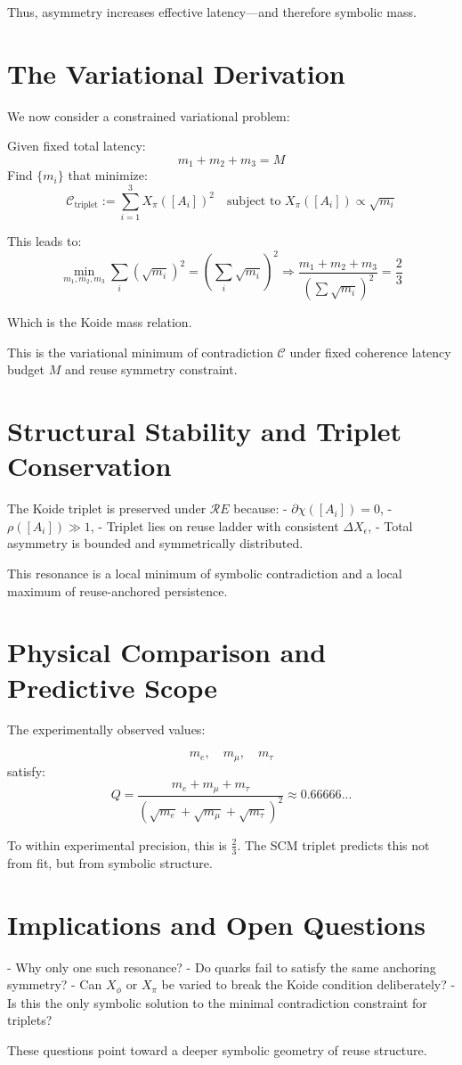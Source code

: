 Thus, asymmetry increases effective latency—and therefore symbolic mass.

\section{The Variational Derivation} \label{sec:koide-derivation}

We now consider a constrained variational problem:

Given fixed total latency:
\[
m_1 + m_2 + m_3 = M
\]
Find $\{m_i\}$ that minimize:
\[
\mathcal{C}_{\text{triplet}} := \sum_{i=1}^3 X_\pi([A_i])^2
\quad \text{subject to } X_\pi([A_i]) \propto \sqrt{m_i}
\]

This leads to:
\[
\min_{m_1, m_2, m_3} \sum_i \left( \sqrt{m_i} \right)^2 = \left( \sum_i \sqrt{m_i} \right)^2
\Rightarrow
\frac{m_1 + m_2 + m_3}{\left( \sum \sqrt{m_i} \right)^2}
= \frac{2}{3}
\]

Which is the Koide mass relation.

This is the variational minimum of contradiction $\mathcal{C}$ under fixed coherence latency budget $M$ and reuse symmetry constraint.

\section{Structural Stability and Triplet Conservation} \label{sec:koide-stability}

The Koide triplet is preserved under $\mathcal{R}E$ because:
- $\partial\chi([A_i]) = 0$,
- $\rho([A_i]) \gg 1$,
- Triplet lies on reuse ladder with consistent $\Delta X_\epsilon$,
- Total asymmetry is bounded and symmetrically distributed.

This resonance is a local minimum of symbolic contradiction and a local maximum of reuse-anchored persistence.

\section{Physical Comparison and Predictive Scope} \label{sec:koide-physical}

The experimentally observed values:

\[
m_e,\quad m_\mu,\quad m_\tau
\]
satisfy:
\[
Q = \frac{m_e + m_\mu + m_\tau}{\left( \sqrt{m_e} + \sqrt{m_\mu} + \sqrt{m_\tau} \right)^2} \approx 0.66666...
\]

To within experimental precision, this is $\frac{2}{3}$. The SCM triplet predicts this not from fit, but from symbolic structure.

\section{Implications and Open Questions} \label{sec:koide-open}

- Why only one such resonance?  
- Do quarks fail to satisfy the same anchoring symmetry?
- Can $X_\phi$ or $X_\pi$ be varied to break the Koide condition deliberately?
- Is this the only symbolic solution to the minimal contradiction constraint for triplets?

These questions point toward a deeper symbolic geometry of reuse structure.

